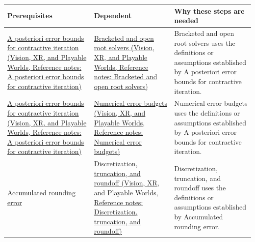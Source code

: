 {\def\LTcaptype{none} %
\begin{longtable}[]{@{}
  >{\raggedright\arraybackslash}p{}
  >{\raggedright\arraybackslash}p{}
  >{\raggedright\arraybackslash}p{}@{}}
\toprule\noalign{}
\begin{minipage}[b]{\linewidth}\raggedright
Prerequisites
\end{minipage} & \begin{minipage}[b]{\linewidth}\raggedright
Dependent
\end{minipage} & \begin{minipage}[b]{\linewidth}\raggedright
Why these steps are needed
\end{minipage} \\
\midrule\noalign{}
\endhead
\bottomrule\noalign{}
\endlastfoot
\href{../07-Vision-XR-and-Playable-Worlds/main.pdf\#nameddest=appendix-d83b0ad1be7f}{A posteriori error bounds for contractive iteration (Vision, XR, and Playable Worlds, Reference notes: A posteriori error bounds for contractive iteration)} & \href{../07-Vision-XR-and-Playable-Worlds/main.pdf\#nameddest=appendix-f63eb850796d}{Bracketed and open root solvers (Vision, XR, and Playable Worlds, Reference notes: Bracketed and open root solvers)} & Bracketed and open root solvers uses the definitions or assumptions established by A posteriori error bounds for contractive iteration. \\
\href{../07-Vision-XR-and-Playable-Worlds/main.pdf\#nameddest=appendix-d83b0ad1be7f}{A posteriori error bounds for contractive iteration (Vision, XR, and Playable Worlds, Reference notes: A posteriori error bounds for contractive iteration)} & \href{../07-Vision-XR-and-Playable-Worlds/main.pdf\#nameddest=appendix-31b8c295e05f}{Numerical error budgets (Vision, XR, and Playable Worlds, Reference notes: Numerical error budgets)} & Numerical error budgets uses the definitions or assumptions established by A posteriori error bounds for contractive iteration. \\
\hyperref[appendix-f82e270791c8]{Accumulated rounding error} & \href{../07-Vision-XR-and-Playable-Worlds/main.pdf\#nameddest=appendix-6b0648b2b8e8}{Discretization, truncation, and roundoff (Vision, XR, and Playable Worlds, Reference notes: Discretization, truncation, and roundoff)} & Discretization, truncation, and roundoff uses the definitions or assumptions established by Accumulated rounding error. \\

\end{longtable}}
